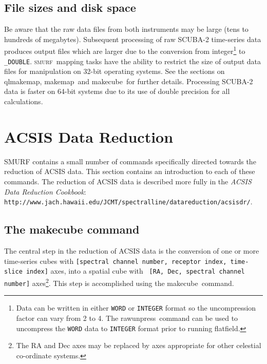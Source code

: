 \documentclass[twoside,11pt]{article}
\newcommand{\htmladdnormallink}[2]{#1}
\newcommand{\xref}[3]{#1}
\newcommand{\xlabel}[1]{}
\renewcommand{\_}{\texttt{\symbol{95}}}
\newcommand{\SMURF}{\textsc{smurf}}
\newcommand{\task}[1]{\textsf{#1}}
\newcommand{\makecube}{\xref{\task{makecube}}{sun258}{MAKECUBE}}
\newcommand{\qlmakemap}{\xref{\task{qlmakemap}}{sun258}{QLMAKEMAP}}
\newcommand{\rawunpress}{\xref{\task{rawunpress}}{sun258}{RAWUNPRESS}}
\newcommand{\flatfield}{\xref{\task{flatfield}}{sun258}{FLATFIELD}}
\newcommand{\makemap}{\xref{\task{makemap}}{sun258}{MAKEMAP}}
\begin{document}
\subsection{File sizes and disk space}

Be aware that the raw data files from both instruments may be large
(tens to hundreds of megabytes). Subsequent processing of raw SCUBA-2
time-series data produces output files which are larger due to the
conversion from integer\footnote{Data can be written in either
  \texttt{\_WORD} or \texttt{\_INTEGER} format so the uncompression
  factor can vary from 2 to 4. The \rawunpress\ command can be used to
  uncompress the \texttt{\_WORD} data to \texttt{\_INTEGER} format
  prior to running \flatfield.}  to \verb+_DOUBLE+. \SMURF\ mapping
tasks have the ability to restrict the size of output data files for
manipulation on 32-bit operating systems. See the sections on
\qlmakemap, \makemap\ and \makecube\ for further details. Processing
SCUBA-2 data is faster on 64-bit systems due to its use of double
precision for all calculations.

\section{\xlabel{acsis}ACSIS Data Reduction\label{se:acsisdr}}

SMURF contains a small number of commands specifically directed towards
the reduction of ACSIS data. This section contains an introduction to
each of these commands. The reduction of ACSIS data is described
more fully in the {\em ACSIS Data Reduction Cookbook}:
\htmladdnormallink{\texttt{http://www.jach.hawaii.edu/JCMT/spectral\_line/data\_reduction/acsisdr/}}
{http://www.jach.hawaii.edu/JCMT/spectral_line/data_reduction/acsisdr/}.

\subsection{The makecube command}

The central step in the reduction of ACSIS data is the conversion of one
or more time-series cubes with {\tt [spectral channel number, receptor
index, time-slice index]} axes, into a spatial cube with {\tt
[RA, Dec, spectral channel number]} axes\footnote{The RA and Dec axes may
be replaced by axes appropriate for other celestial co-ordinate
systems.}. This step is accomplished using the \makecube\ command.
\end{document}
